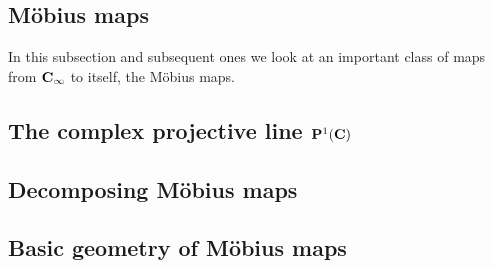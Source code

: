 \subsection{M\"{o}bius maps}
In this subsection and subsequent ones we look at an important class of maps from $\mathbf C_\infty$ to itself, the M\"{o}bius maps.

\subsection{The complex projective line $\mathbf P^1(\mathbf C)$}
\subsection{Decomposing M\"{o}bius maps}
\subsection{Basic geometry of M\"{o}bius maps}